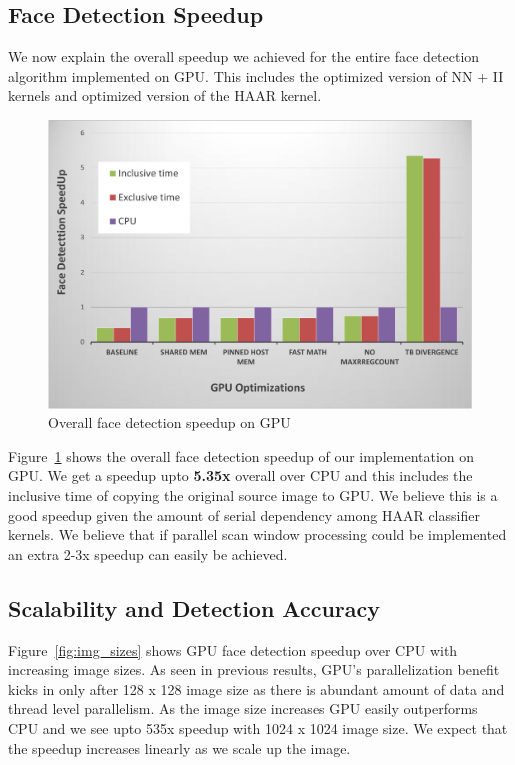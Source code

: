 \subsection{Face Detection Speedup}
We now explain the overall speedup we achieved for the entire face detection algorithm implemented on GPU.
This includes the optimized version of NN + II kernels and optimized version of the HAAR kernel.

\vspace{-0.1in}
\begin{figure}[h]
  \centering
  \includegraphics[width=\linewidth]{figs/gpu_overall_crop.pdf}
  \caption{Overall face detection speedup on GPU}
  \label{fig:gpu_overall}
\end{figure}

\vspace{-0.1in}
Figure~\ref{fig:gpu_overall} shows the overall face detection speedup of our implementation 
on GPU. We get a speedup upto \textbf{5.35x} overall over CPU and this includes the inclusive time of copying the
original source image to GPU. We believe this is a good speedup given the amount of serial dependency among HAAR 
classifier kernels. We believe that if parallel scan window processing could be implemented an extra 2-3x speedup can easily be achieved.


\subsection{Scalability and Detection Accuracy}
Figure~\ref{fig:img_sizes} shows GPU face detection speedup over CPU with increasing image sizes. 
As seen in previous results, GPU's parallelization benefit kicks in only after 128 x 128 image size as there
is abundant amount of data and thread level parallelism. As the image size increases GPU easily outperforms CPU and we see
upto 535x speedup with 1024 x 1024 image size. We expect that the speedup increases linearly as we scale up the image.



